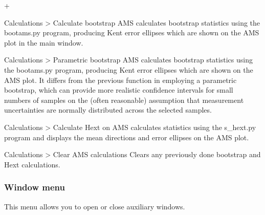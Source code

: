 \documentclass[a4paper,british]{article}
\newcommand{\menuitemlabel}[1]{%
\mbox{\textsf{#1}}\hfil}
\newenvironment{menuitemlist}%
{\begin{list}{}{%
\renewcommand{\makelabel}{\menuitemlabel}%
\setlength{\labelwidth}{35pt}%
\setlength{\leftmargin}%
             {\labelwidth+\labelsep}}}%
{\end{list}}
\newcommand{\ppcmd}[1]{\textsf{#1}} %
\newcommand{\caps}[1]{\MakeTextUppercase{#1}} %
\newcommand{\submenu}{ \textgreater{} } %
\begin{document}
\begin{menuitemlist}

\item[Calculations\submenu Calculate bootstrap \caps{ams}] calculates
bootstrap statistics using the \ppcmd{bootams.py} program, producing
Kent error ellipses which are shown on the \caps{ams} plot in the main
window.

\item[Calculations\submenu Parametric bootstrap \caps{ams}] calculates
bootstrap statistics using the \ppcmd{bootams.py} program, producing Kent
error ellipses which are shown on the \caps{ams} plot. It differs from the
previous function in employing a parametric bootstrap, which can provide more
realistic confidence intervals for small numbers of samples on the (often
reasonable) assumption that measurement uncertainties are normally
distributed across the selected samples.

\item[Calculations\submenu Calculate Hext on \caps{ams}] calculates
\cite{hext1963tensors} statistics using the \ppcmd{s\_hext.py} program
and displays the mean directions and error ellipses on the \caps{ams} plot.

\item[Calculations\submenu Clear \caps{ams} calculations] Clears
any previously done bootstrap and Hext calculations.

\end{menuitemlist}

\subsubsection{\label{sec:menu-window}Window menu}

This menu allows you to open or close auxiliary windows.
\end{document}
